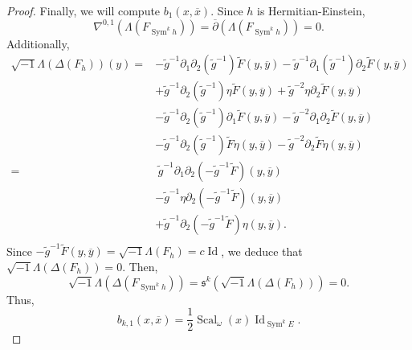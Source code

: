\documentclass{amsart}
\theoremstyle{definition}
\theoremstyle{remark}
\numberwithin{equation}{section}
\DeclareMathOperator{\Sym}{Sym}
\DeclareMathOperator{\Id}{Id}
\DeclareMathOperator{\Scal}{Scal}
\begin{document}
\begin{proof}
Finally, we will compute $b_1(x,\overline{x})$. Since $h$ is Hermitian-Einstein, 
\begin{equation*}
\nabla^{0,1} (\Lambda (F_{\Sym^k h})) = \overline{\partial} (\Lambda (F_{\Sym^k h})) = 0.    
\end{equation*}
Additionally,
\begin{equation*}
\begin{split}
\sqrt{-1} \Lambda (\Delta (F_{ h}))(y) =  & - \tilde{g}^{-1}\partial_1\partial_2(\tilde{g}^{-1}) \tilde{F}(y,\overline{y}) - \tilde{g}^{-1} \partial_1(\tilde{g}^{-1}) \partial_2\tilde{F}(y,\overline{y}) \\
    & + \tilde{g}^{-1} \partial_2(\tilde{g}^{-1}) \eta \tilde{F} (y,\overline{y}) + \tilde{g}^{-2} \eta \partial_2 \tilde{F}(y,\overline{y}) \\
    & -\tilde{g}^{-1} \partial_2(\tilde{g}^{-1}) \partial_1\tilde{F}(y,\overline{y}) - \tilde{g}^{-2} \partial_1\partial_2\tilde{F}(y,\overline{y}) \\
    & - \tilde{g}^{-1} \partial_2(\tilde{g}^{-1}) \tilde{F} \eta(y,\overline{y}) - \tilde{g}^{-2} \partial_2\tilde{F}\eta(y,\overline{y}) \\
    = & \hspace{3pt} \tilde{g}^{-1} \partial_1\partial_2(-\tilde{g}^{-1} \tilde{F}) (y,\overline{y}) \\
    & - \tilde{g}^{-1} \eta \partial_2(-\tilde{g}^{-1} \tilde{F}) (y,\overline{y})\\
    & +  \tilde{g}^{-1} \partial_2(-\tilde{g}^{-1} \tilde{F}) \eta (y,\overline{y}). \\
\end{split}
\end{equation*}
Since $-\tilde{g}^{-1} \tilde{F}(y,\overline{y}) = \sqrt{-1}\Lambda (F_{ h}) = c \Id$, we deduce that $\sqrt{-1} \Lambda(\Delta(F_{h})) = 0$. Then, 
\begin{equation*}
    \sqrt{-1} \Lambda(\Delta(F_{\Sym^k h})) =  \mathfrak{s}^k (\sqrt{-1} \Lambda(\Delta(F_{h}))) = 0.
\end{equation*}
Thus,
\begin{equation*}
 b_{k,1}(x,\overline{x}) = \frac{1}{2} \Scal_\omega(x) \Id_{\Sym^k E}.
\end{equation*}

\end{proof}
\end{document}
